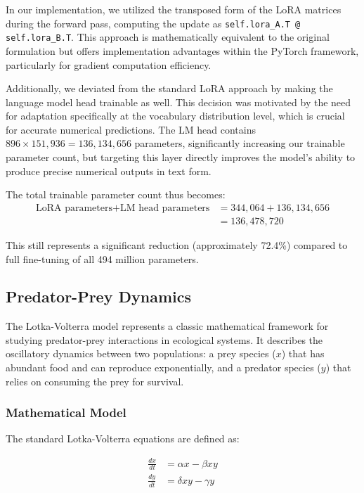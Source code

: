 \documentclass{article}
\begin{document}
In our implementation, we utilized the transposed form of the LoRA matrices during the forward pass, computing the update as \texttt{self.lora\_A.T @ self.lora\_B.T}. This approach is mathematically equivalent to the original formulation but offers implementation advantages within the PyTorch framework, particularly for gradient computation efficiency.

Additionally, we deviated from the standard LoRA approach by making the language model head trainable as well. This decision was motivated by the need for adaptation specifically at the vocabulary distribution level, which is crucial for accurate numerical predictions. The LM head contains $896 \times 151,936 = 136,134,656$ parameters, significantly increasing our trainable parameter count, but targeting this layer directly improves the model's ability to produce precise numerical outputs in text form.

The total trainable parameter count thus becomes:
\begin{align}
\text{LoRA parameters} + \text{LM head parameters} &= 344,064 + 136,134,656\\
&= 136,478,720
\end{align}

This still represents a significant reduction (approximately 72.4\%) compared to full fine-tuning of all 494 million parameters.
\subsection*{Predator-Prey Dynamics}

The Lotka-Volterra model represents a classic mathematical framework for studying predator-prey interactions in ecological systems. It describes the oscillatory dynamics between two populations: a prey species ($x$) that has abundant food and can reproduce exponentially, and a predator species ($y$) that relies on consuming the prey for survival.

\subsubsection*{Mathematical Model}

The standard Lotka-Volterra equations are defined as:

\begin{align}
\frac{dx}{dt} &= \alpha x - \beta xy \\
\frac{dy}{dt} &= \delta xy - \gamma y
\end{align}
\end{document}
